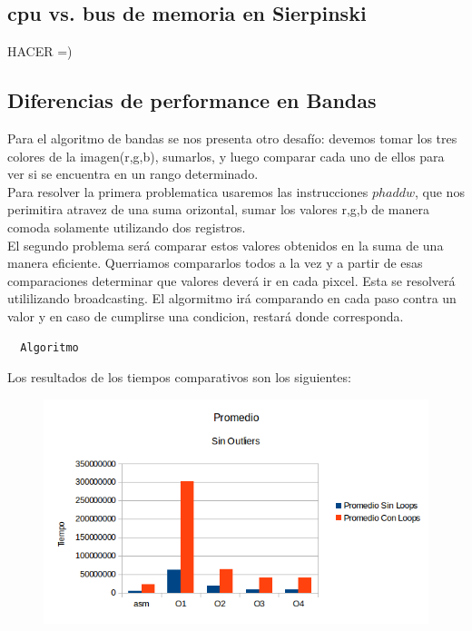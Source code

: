 \documentclass[a4paper]{article}
\begin{document}
\subsection{cpu vs. bus de memoria en Sierpinski}
HACER =)

\newpage
\subsection{Diferencias de performance en Bandas}
Para el algoritmo de bandas se nos presenta otro desafío: devemos tomar los tres colores de la imagen(r,g,b), sumarlos, y luego comparar cada uno de ellos para ver si se encuentra en un rango determinado.
\\
Para resolver la primera problematica usaremos las instrucciones $phaddw$, que nos perimitira atravez de una suma orizontal, sumar los valores r,g,b de manera comoda solamente utilizando dos registros.
\\
El segundo problema será comparar estos valores obtenidos en la suma de una manera eficiente. Querriamos compararlos todos a la vez y a partir de esas comparaciones determinar que valores deverá ir en cada pixcel. Esta se resolverá utililizando broadcasting. El algormitmo irá comparando en cada paso contra un valor y en caso de cumplirse una condicion, restará donde corresponda.

\begin{codesnippet}
\begin{verbatim}
  Algoritmo
\end{verbatim}
\end{codesnippet}

Los resultados de los tiempos comparativos son los siguientes:

\begin{figure}[h!]
  \begin{center}
  \includegraphics[scale=0.66]{GraficosTesting/ban/PSO.png}
  \label{nombreparareferenciar9}
  \end{center}
\end{figure}
\end{document}
